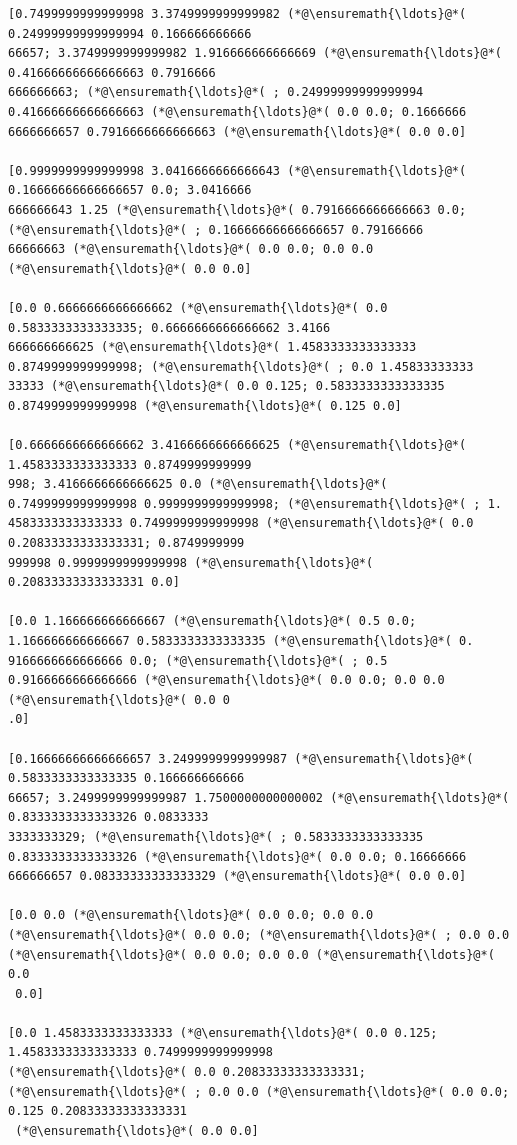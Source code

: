 \documentclass[12pt,a4paper]{article}
\begin{document}
\begin{lstlisting}
[0.7499999999999998 3.3749999999999982 (*@\ensuremath{\ldots}@*( 0.24999999999999994 0.166666666666
66657; 3.3749999999999982 1.916666666666669 (*@\ensuremath{\ldots}@*( 0.41666666666666663 0.7916666
666666663; (*@\ensuremath{\ldots}@*( ; 0.24999999999999994 0.41666666666666663 (*@\ensuremath{\ldots}@*( 0.0 0.0; 0.1666666
6666666657 0.7916666666666663 (*@\ensuremath{\ldots}@*( 0.0 0.0]

[0.9999999999999998 3.0416666666666643 (*@\ensuremath{\ldots}@*( 0.16666666666666657 0.0; 3.0416666
666666643 1.25 (*@\ensuremath{\ldots}@*( 0.7916666666666663 0.0; (*@\ensuremath{\ldots}@*( ; 0.16666666666666657 0.79166666
66666663 (*@\ensuremath{\ldots}@*( 0.0 0.0; 0.0 0.0 (*@\ensuremath{\ldots}@*( 0.0 0.0]

[0.0 0.6666666666666662 (*@\ensuremath{\ldots}@*( 0.0 0.5833333333333335; 0.6666666666666662 3.4166
666666666625 (*@\ensuremath{\ldots}@*( 1.4583333333333333 0.8749999999999998; (*@\ensuremath{\ldots}@*( ; 0.0 1.45833333333
33333 (*@\ensuremath{\ldots}@*( 0.0 0.125; 0.5833333333333335 0.8749999999999998 (*@\ensuremath{\ldots}@*( 0.125 0.0]

[0.6666666666666662 3.4166666666666625 (*@\ensuremath{\ldots}@*( 1.4583333333333333 0.8749999999999
998; 3.4166666666666625 0.0 (*@\ensuremath{\ldots}@*( 0.7499999999999998 0.9999999999999998; (*@\ensuremath{\ldots}@*( ; 1.
4583333333333333 0.7499999999999998 (*@\ensuremath{\ldots}@*( 0.0 0.20833333333333331; 0.8749999999
999998 0.9999999999999998 (*@\ensuremath{\ldots}@*( 0.20833333333333331 0.0]

[0.0 1.166666666666667 (*@\ensuremath{\ldots}@*( 0.5 0.0; 1.166666666666667 0.5833333333333335 (*@\ensuremath{\ldots}@*( 0.
9166666666666666 0.0; (*@\ensuremath{\ldots}@*( ; 0.5 0.9166666666666666 (*@\ensuremath{\ldots}@*( 0.0 0.0; 0.0 0.0 (*@\ensuremath{\ldots}@*( 0.0 0
.0]

[0.16666666666666657 3.2499999999999987 (*@\ensuremath{\ldots}@*( 0.5833333333333335 0.166666666666
66657; 3.2499999999999987 1.7500000000000002 (*@\ensuremath{\ldots}@*( 0.8333333333333326 0.0833333
3333333329; (*@\ensuremath{\ldots}@*( ; 0.5833333333333335 0.8333333333333326 (*@\ensuremath{\ldots}@*( 0.0 0.0; 0.16666666
666666657 0.08333333333333329 (*@\ensuremath{\ldots}@*( 0.0 0.0]

[0.0 0.0 (*@\ensuremath{\ldots}@*( 0.0 0.0; 0.0 0.0 (*@\ensuremath{\ldots}@*( 0.0 0.0; (*@\ensuremath{\ldots}@*( ; 0.0 0.0 (*@\ensuremath{\ldots}@*( 0.0 0.0; 0.0 0.0 (*@\ensuremath{\ldots}@*( 0.0
 0.0]

[0.0 1.4583333333333333 (*@\ensuremath{\ldots}@*( 0.0 0.125; 1.4583333333333333 0.7499999999999998 
(*@\ensuremath{\ldots}@*( 0.0 0.20833333333333331; (*@\ensuremath{\ldots}@*( ; 0.0 0.0 (*@\ensuremath{\ldots}@*( 0.0 0.0; 0.125 0.20833333333333331
 (*@\ensuremath{\ldots}@*( 0.0 0.0]


\end{lstlisting}
\end{document}

